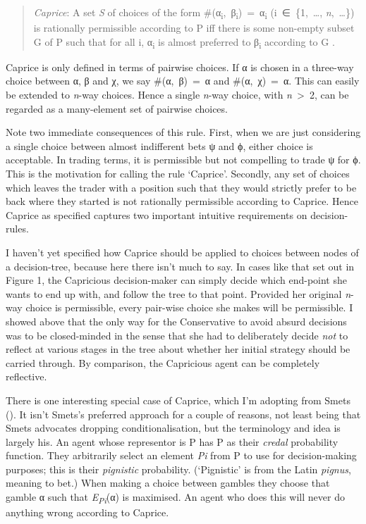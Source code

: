 \documentclass[
  11pt,
  letterpaper,
  DIV=11,
  numbers=noendperiod,
  twoside]{scrartcl}
\begin{document}
\begin{quote}
\emph{Caprice}: A set \emph{S} of choices of the form
\#(α\textsubscript{i},~β\textsubscript{i})~=~α\textsubscript{i}
(i~∈~\{1,~\ldots, \emph{n},~\ldots\}) is rationally permissible
according to P iff there is some non-empty subset G of P such that for
all i, α\textsubscript{i} is almost preferred to β\textsubscript{i}
according to G .
\end{quote}

Caprice is only defined in terms of pairwise choices. If α is chosen in
a three-way choice between α, β and χ, we say \#(α,~β)~=~α and
\#(α,~χ)~=~α. This can easily be extended to \emph{n}-way choices. Hence
a single \emph{n}-way choice, with \emph{n}~\textgreater~2, can be
regarded as a many-element set of pairwise choices.

Note two immediate consequences of this rule. First, when we are just
considering a single choice between almost indifferent bets ψ and ϕ,
either choice is acceptable. In trading terms, it is permissible but not
compelling to trade ψ for ϕ. This is the motivation for calling the rule
`Caprice'. Secondly, any set of choices which leaves the trader with a
position such that they would strictly prefer to be back where they
started is not rationally permissible according to Caprice. Hence
Caprice as specified captures two important intuitive requirements on
decision-rules.

I haven't yet specified how Caprice should be applied to choices between
nodes of a decision-tree, because here there isn't much to say. In cases
like that set out in Figure 1, the Capricious decision-maker can simply
decide which end-point she wants to end up with, and follow the tree to
that point. Provided her original \emph{n}-way choice is permissible,
every pair-wise choice she makes will be permissible. I showed above
that the only way for the Conservative to avoid absurd decisions was to
be closed-minded in the sense that she had to deliberately decide
\emph{not} to reflect at various stages in the tree about whether her
initial strategy should be carried through. By comparison, the
Capricious agent can be completely reflective.

There is one interesting special case of Caprice, which I'm adopting
from Smets (). It isn't Smets's preferred
approach for a couple of reasons, not least being that Smets advocates
dropping conditionalisation, but the terminology and idea is largely
his. An agent whose representor is P has P as their \emph{credal}
probability function. They arbitrarily select an element \emph{Pi} from
P to use for decision-making purposes; this is their \emph{pignistic}
probability. (`Pignistic' is from the Latin \emph{pignus}, meaning to
bet.) When making a choice between gambles they choose that gamble α
such that \emph{E\textsubscript{Pi}}(α) is maximised. An agent who does
this will never do anything wrong according to Caprice.
\end{document}
